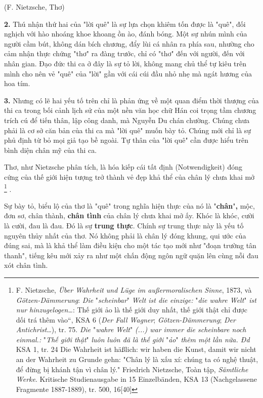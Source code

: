 \documentclass[../main.tex]{subfiles}
\begin{document}
\begin{multicols}{2}
\begin{blockquote}
(F. Nietzsche, Thơ)  

\end{blockquote}
 
\textbf{2.} Thú nhận thứ hai của "lời quê" là  sự lựa chọn khiêm tốn được là "quê", đối nghịch với hào nhoáng khoe khoang ồn ào, đánh bóng. Một sự nhún mình của người cầm bút, không dán bích chương, đẩy lùi cá nhân ra phía sau, nhường cho cảm nhận thực chứng "thơ" ra đàng trước, chỉ có "thơ" đến với người, đến với nhân gian. Đạo đức thi ca ở đây là sự tỏ lời, không mang chủ thể tự kiêu trên mình cho nên vẻ "quê" của "lời" gần với cái cúi đầu nhỏ nhẹ mà ngát hương của hoa tím.  
 
\textbf{3.} Nhưng có lẽ hai yếu tố trên chỉ là phản ứng về một quan điểm thời thượng của thi ca trong bối cảnh lịch sử của một nền văn học chữ Hán coi trọng tầm chương trích cú để tiến thân, lập công danh, mà Nguyễn Du chán chường. Chúng chưa phải là cơ sở căn bản của thi ca mà "lời quê" muốn bày tỏ. Chúng mới chỉ là sự phủ định từ bỏ mọi giả tạo bề ngoài. Tự thân của "lời quê" cần được hiểu trên bình diện chân mỹ của thi ca.  
 
Thơ, như Nietzsche phân tích, là hóa kiếp cái tất định (Notwendigkeit) đóng cứng của thế giới hiện tượng trở thành vẻ đẹp khả thể của chân lý chưa khai mở \footnote{
F. Nietzsche, \textit{Über Wahrheit und Lüge im außermoralischen Sinne}, 1873, và \textit{Götzen-Dämmerung}: \textit{Die }"\textit{scheinbar}"\textit{ Welt ist die einzige: }"\textit{die wahre Welt}"\textit{ ist nur hinzugelogen…}: Thế giới ảo là thế giới duy nhất, thế giới thật chỉ được dối trá thêm vào“, KSA 6 (\textit{Der Fall Wagner}; \textit{Götzen-Dämmerung}; \textit{Der Antichrist}…), tr. 75. 
\textit{Die }"\textit{wahre Welt}"\textit{ (...) war immer die scheinbare noch einmal.: }"\textit{Thế giới thật}"\textit{ luôn luôn đã là thế giới }"\textit{ảo}"\textit{ thêm một lần nữa. Đd  }KSA 1, tr. 24 
Die Wahrheit ist häßlich: wir haben die Kunst, damit wir nicht an der Wahrheit zu Grunde gehn: "Chân lý là xấu xí: chúng ta có nghệ thuật, để đừng bị khánh tận vì chân lý." Friedrich Nietzsche, Toàn tập, \textit{Sämtliche Werke}. Kritische Studienausgabe in 15 Einzelbänden,  KSA 13 (Nachgelassene Fragmente 1887-1889), tr. 500, 16[40]} .     
 
Sự bày tỏ, biểu lộ của thơ  là "quê" trong nghĩa hiện thực của nó là "\textbf{chân}"\textbf{,} mộc, đơn sơ, chân thành, \textbf{chân tình} của chân lý chưa khai mở ấy. Khóc là khóc, cười là cười, đau là đau. Đó là sự \textbf{trung thực}. Chính sự trung thực này là yếu tố nguyên thủy nhất  của thơ. Nó không phải là chân lý đóng khung, qui ước của đúng sai, mà là khả thể làm điều kiện cho một tác tạo mới như "đoạn trường tân thanh", tiếng kêu mới xảy ra như một chấn động ngôn ngữ quặn lên cùng nỗi đau xót chân tình.  
 

\end{multicols}
\end{document}
